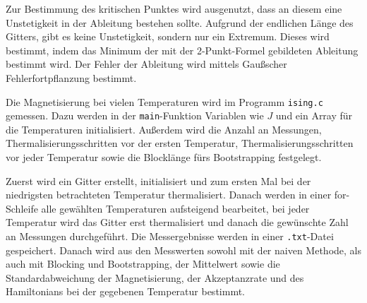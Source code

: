 	
	
	
	Zur Bestimmung des kritischen Punktes wird ausgenutzt, dass an diesem eine Unstetigkeit in der Ableitung bestehen sollte. Aufgrund der endlichen Länge des Gitters, gibt es keine Unstetigkeit, sondern nur ein Extremum. Dieses wird bestimmt, indem das Minimum der mit der 2-Punkt-Formel gebildeten Ableitung bestimmt wird. Der Fehler der Ableitung wird mittels Gaußscher Fehlerfortpflanzung bestimmt.
		
	Die Magnetisierung bei vielen Temperaturen wird im Programm \texttt{ising.c} gemessen. Dazu werden in der \texttt{main}-Funktion Variablen wie $J$ und ein Array für die Temperaturen initialisiert. Außerdem wird die Anzahl an Messungen, Thermalisierungsschritten vor der ersten Temperatur, Thermalisierungsschritten vor jeder Temperatur sowie die Blocklänge fürs Bootstrapping festgelegt. 	
	
	Zuerst wird ein Gitter erstellt, initialisiert und zum ersten Mal bei der niedrigsten betrachteten Temperatur thermalisiert. Danach werden in einer for-Schleife alle gewählten Temperaturen aufsteigend bearbeitet, bei jeder Temperatur wird das Gitter erst thermalisiert und danach die gewünschte Zahl an Messungen durchgeführt.
	Die Messergebnisse werden in einer \texttt{.txt}-Datei gespeichert. Danach wird aus den Messwerten sowohl mit der naiven Methode, als auch mit Blocking und Bootstrapping, der Mittelwert sowie die Standardabweichung der Magnetisierung, der Akzeptanzrate und des Hamiltonians bei der gegebenen Temperatur bestimmt.
	
